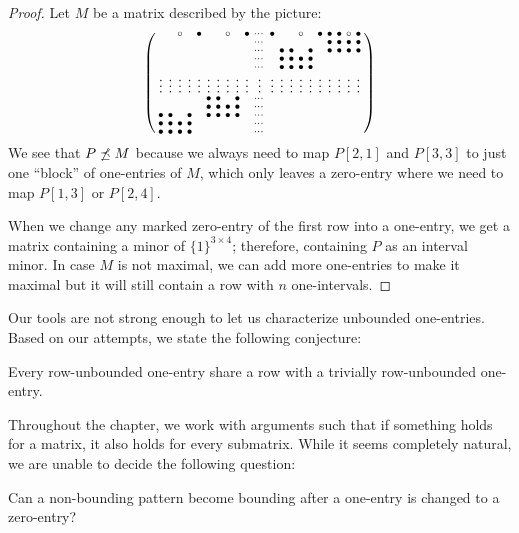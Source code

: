 \begin{proof} Let $M$ be a matrix described by the picture:
$$\left(\begin{smallmatrix}	 & &\circ& &\bullet& & &\circ& &\bullet&\cdots&\bullet& & &\circ& &\bullet&\bullet&\bullet&\circ&\bullet\\
		 & & & & & & & & & &\cdots& & & & & & &\bullet&\bullet&\bullet&\bullet\\
		 & & & & & & & & & &\cdots& &\bullet&\bullet& &\bullet& &\bullet&\bullet&\bullet&\bullet\\
		 & & & & & & & & & &\cdots& &\bullet&\bullet&\bullet&\bullet& & & & & \\
		 & & & & & & & & & &\cdots& &\bullet&\bullet&\bullet&\bullet& & & & & \\
		\vdots&\vdots&\vdots&\vdots&\vdots&\vdots&\vdots&\vdots&\vdots&\vdots&\vdots&\vdots&\vdots&\vdots&\vdots&\vdots&\vdots&\vdots&\vdots&\vdots&\vdots\\
		 & & & & &\bullet&\bullet& &\bullet& &\cdots& & & & & & & \\
		 & & & & &\bullet&\bullet&\bullet&\bullet& &\cdots& & & & & & & \\
		\bullet&\bullet& &\bullet& &\bullet&\bullet&\bullet&\bullet& &\cdots& & & & & & & \\
		\bullet&\bullet&\bullet&\bullet& & & & & & &\cdots& & & & & & & \\
		\bullet&\bullet&\bullet&\bullet& & & & & & &\cdots& & & & & & & \\
		 \end{smallmatrix}\right)$$
We see that $P\not\preceq M$ because we always need to map $P[2,1]$ and $P[3,3]$ to just one ``block'' of one-entries of $M$, which only leaves a zero-entry where we need to map $P[1,3]$ or $P[2,4]$.

When we change any marked zero-entry of the first row into a one-entry, we get a matrix containing a minor of $\{1\}^{3\times4}$; therefore, containing $P$ as an interval minor. In case $M$ is not maximal, we can add more one-entries to make it maximal but it will still contain a row with $n$ one-intervals.
\end{proof}
Our tools are not strong enough to let us characterize unbounded one-entries. Based on our attempts, we state the following conjecture:
\begin{conj}
Every row-unbounded one-entry share a row with a trivially row-unbounded one-entry.
\end{conj}

Throughout the chapter, we work with arguments such that if something holds for a matrix, it also holds for every submatrix. While it seems completely natural, we are unable to decide the following question:
\begin{ques}
Can a non-bounding pattern become bounding after a one-entry is changed to a zero-entry?
\end{ques}

